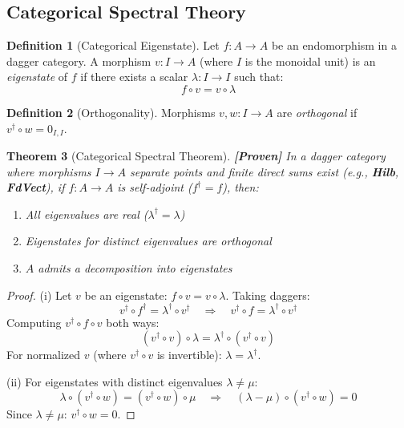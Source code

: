\documentclass[11pt]{article}
\newtheorem{theorem}{Theorem}[section]
\theoremstyle{definition}
\newtheorem{definition}[theorem]{Definition}
\theoremstyle{remark}
\begin{document}
\subsection{Categorical Spectral Theory}

\begin{definition}[Categorical Eigenstate]
Let $f : A \to A$ be an endomorphism in a dagger category. A morphism $v : I \to A$ (where $I$ is the monoidal unit) is an \emph{eigenstate} of $f$ if there exists a scalar $\lambda : I \to I$ such that:
\[
f \circ v = v \circ \lambda
\]
\end{definition}

\begin{definition}[Orthogonality]
Morphisms $v, w : I \to A$ are \emph{orthogonal} if $v^\dagger \circ w = 0_{I,I}$.
\end{definition}

\begin{theorem}[Categorical Spectral Theorem]\label{thm:cat_spectral}
\textbf{[Proven]} In a dagger category where morphisms $I \to A$ separate points and finite direct sums exist (e.g., \textbf{Hilb}, \textbf{FdVect}), if $f : A \to A$ is self-adjoint ($f^\dagger = f$), then:
\begin{enumerate}[label=(\roman*)]
    \item All eigenvalues are real ($\lambda^\dagger = \lambda$)
    \item Eigenstates for distinct eigenvalues are orthogonal
    \item $A$ admits a decomposition into eigenstates
\end{enumerate}
\end{theorem}

\begin{proof}
(i) Let $v$ be an eigenstate: $f \circ v = v \circ \lambda$. Taking daggers:
\[
v^\dagger \circ f^\dagger = \lambda^\dagger \circ v^\dagger \quad \Rightarrow \quad v^\dagger \circ f = \lambda^\dagger \circ v^\dagger
\]
Computing $v^\dagger \circ f \circ v$ both ways:
\[
(v^\dagger \circ v) \circ \lambda = \lambda^\dagger \circ (v^\dagger \circ v)
\]
For normalized $v$ (where $v^\dagger \circ v$ is invertible): $\lambda = \lambda^\dagger$.

(ii) For eigenstates with distinct eigenvalues $\lambda \neq \mu$:
\[
\lambda \circ (v^\dagger \circ w) = (v^\dagger \circ w) \circ \mu \quad \Rightarrow \quad (\lambda - \mu) \circ (v^\dagger \circ w) = 0
\]
Since $\lambda \neq \mu$: $v^\dagger \circ w = 0$.
\end{proof}
\end{document}
